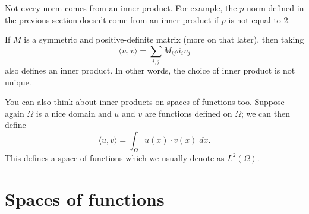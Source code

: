 \documentclass{article}
\theoremstyle{definition}
\theoremstyle{plain}
\begin{document}
Not every norm comes from an inner product.
For example, the $p$-norm defined in the previous section doesn't come from an inner product if $p$ is not equal to 2.

If $M$ is a symmetric and positive-definite matrix (more on that later), then taking
\begin{equation}
    \langle u, v\rangle = \sum_{i, j}M_{ij}\overline{u_i}v_j
\end{equation}
also defines an inner product.
In other words, the choice of inner product is not unique.

You can also think about inner products on spaces of functions too.
Suppose again $\Omega$ is a nice domain and $u$ and $v$ are functions defined on $\Omega$; we can then define
\begin{equation}
    \langle u, v\rangle = \int_\Omega \overline{u(x)}\cdot v(x)\; dx.
\end{equation}
This defines a space of functions which we usually denote as $L^2(\Omega)$.


\section{Spaces of functions}
\end{document}
